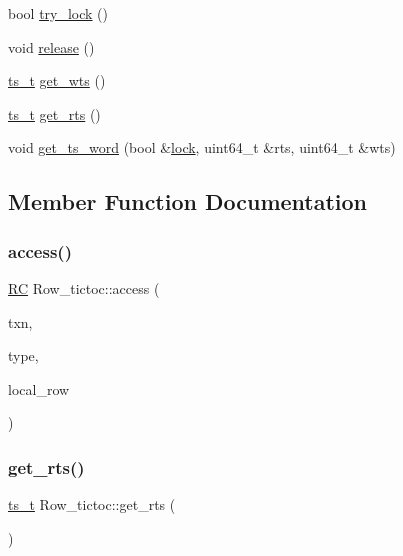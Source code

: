\begin{DoxyCompactItemize}
bool \hyperlink{classRow__tictoc_a726f11ccc49c55ff64160a8c638bedad}{try\+\_\+lock} ()
\item 
void \hyperlink{classRow__tictoc_a0a67be119cc8f17c09c14b4a0294ba73}{release} ()
\item 
\hyperlink{global_8h_aaf095dfc9b10f757c968fe146ad7e724}{ts\+\_\+t} \hyperlink{classRow__tictoc_a8e4797ac556c6ebf9b58d986dbbea0ac}{get\+\_\+wts} ()
\item 
\hyperlink{global_8h_aaf095dfc9b10f757c968fe146ad7e724}{ts\+\_\+t} \hyperlink{classRow__tictoc_aadea8708aa6c023efc6eb3f81d7c8299}{get\+\_\+rts} ()
\item 
void \hyperlink{classRow__tictoc_a7e83376689a8f6504419779ee7348dee}{get\+\_\+ts\+\_\+word} (bool \&\hyperlink{classRow__tictoc_a534c6fe17f2cf8fffc7a1b06eef67b03}{lock}, uint64\+\_\+t \&rts, uint64\+\_\+t \&wts)
\end{DoxyCompactItemize}


\subsection{Member Function Documentation}
\mbox{\label{classRow__tictoc_a6a5b77a305775780a23dc7227ccef937}} 
\subsubsection{\texorpdfstring{access()}{access()}}
{\footnotesize\ttfamily \hyperlink{global_8h_a78c49a674c810fdd03d20432f7be864a}{RC} Row\+\_\+tictoc\+::access (\begin{DoxyParamCaption}\item[{\hyperlink{classtxn__man}{txn\+\_\+man} $\ast$}]{txn,  }\item[{\hyperlink{global_8h_a1a7f6ca1462293fe053b5ae74a6c4eda}{Ts\+Type}}]{type,  }\item[{\hyperlink{classrow__t}{row\+\_\+t} $\ast$}]{local\+\_\+row }\end{DoxyParamCaption})}

\mbox{\label{classRow__tictoc_aadea8708aa6c023efc6eb3f81d7c8299}} 
\subsubsection{\texorpdfstring{get\+\_\+rts()}{get\_rts()}}
{\footnotesize\ttfamily \hyperlink{global_8h_aaf095dfc9b10f757c968fe146ad7e724}{ts\+\_\+t} Row\+\_\+tictoc\+::get\+\_\+rts (\begin{DoxyParamCaption}{ }\end{DoxyParamCaption})}

